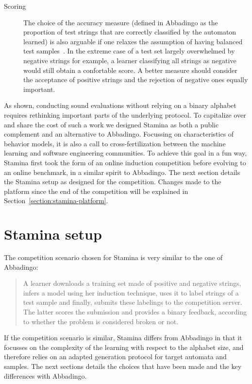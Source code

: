 \begin{description}
\item[Scoring] The choice of the accuracy measure (defined in Abbadingo as the proportion of test strings that are correctly classified by the automaton learned) is also arguable if one relaxes the assumption of having balanced test samples~\cite{Walkinshaw:2008}. In the extreme case of a test set largely overwhelmed by negative strings for example, a learner classifying all strings as negative would still obtain a confortable score. A better measure should consider the acceptance of positive strings and the rejection of negative ones equally important. 
\end{description}

As shown, conducting sound evaluations without relying on a binary alphabet requires rethinking important parts of the underlying protocol. To capitalize over and share the cost of such a work we designed Stamina as both a public complement and an alternative to Abbadingo. Focussing on characteristics of behavior models, it is also a call to cross-fertilization between the machine learning and software engineering communities. To achieve this goal in a fun way, Stamina first took the form of an online induction competition before evolving to an online benchmark, in a similar spirit to Abbadingo. The next section details the Stamina setup as designed for the competition. Changes made to the platform since the end of the competition will be explained in Section~\ref{section:stamina-platform}.


\section{Stamina setup\label{section:stamina-setup}}

The competition scenario chosen for Stamina is very similar to the one of Abbadingo: 

\begin{quotation}
A learner downloads a training set made of positive and negative strings, infers a model using her induction technique, uses it to label strings of a test sample and finally, submits these labelings to the competition server. The latter scores the submission and provides a binary feedback, according to whether the problem is considered broken or not.
\end{quotation}

If the competition scenario is similar, Stamina differs from Abbadingo in that it focusses on the complexity of the learning with respect to the alphabet size, and therefore relies on an adapted generation protocol for target automata and samples. The next sections details the choices that have been made and the key differences with Abbadingo.

